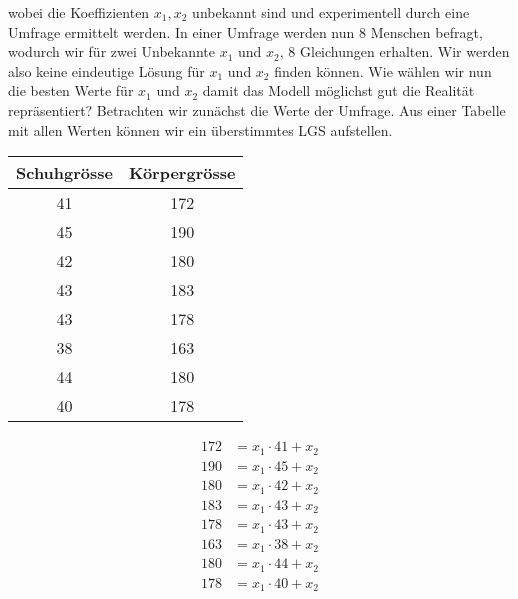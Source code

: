 wobei die Koeffizienten \( x_1, x_2\) unbekannt sind und experimentell durch eine Umfrage ermittelt werden. In einer Umfrage werden nun 8 Menschen befragt, wodurch wir für zwei Unbekannte \( x_1\) und \( x_2\), 8 Gleichungen erhalten. Wir werden also keine eindeutige Lösung für \( x_1\) und \( x_2\) finden können. Wie wählen wir nun die besten Werte für \( x_1\) und \( x_2\) damit das Modell möglichst gut die Realität repräsentiert? Betrachten wir zunächst die Werte der Umfrage. Aus einer Tabelle mit allen Werten können wir ein überstimmtes LGS aufstellen. 

\vspace{1\baselineskip}

\begin{minipage}
    {0.5\textwidth}
    \centering
        \begin{tabular}{|c|c|}
            \hline
            Schuhgrösse & Körpergrösse \\
            \hline
            41 & 172 \\
            45 & 190 \\
            42 & 180 \\
            43 & 183 \\
            43 & 178 \\
            38 & 163 \\
            44 & 180 \\
            40 & 178 \\
            \hline
        \end{tabular}
\end{minipage}
\hfill
\begin{minipage}
    {0.45\textwidth}
    \centering
    \begin{equation*}
        \begin{aligned}
            172 &= x_1\cdot 41 + x_2\\
            190 &= x_1\cdot 45 + x_2\\
            180 &= x_1\cdot 42 + x_2\\
            183 &= x_1\cdot 43 + x_2\\
            178 &= x_1\cdot 43 + x_2\\
            163 &= x_1\cdot 38 + x_2\\
            180 &= x_1\cdot 44 + x_2\\
            178 &= x_1\cdot 40 + x_2\\
        \end{aligned}
    \end{equation*}
\end{minipage}

